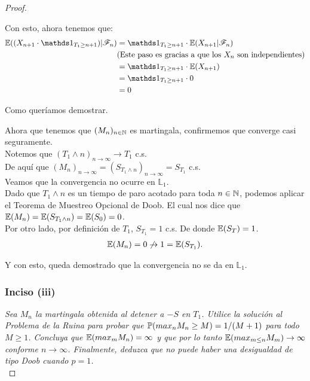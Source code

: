\begin{proof}
\begin{itemize}
				Con esto, ahora tenemos que:
				\begin{align}
					\E((X_{n+1} \cdot \indic_{T_1 \geq n+1}) | \F_{n}) &= \indic_{T_1 \geq n+1} \cdot \E(X_{n+1} | \F_{n}) \\
					&\mbox{(Este paso es gracias a que los $X_n$ son independientes)} \\
					&=\indic_{T_1 \geq n+1} \cdot \E(X_{n+1} ) \\
					&=\indic_{T_1 \geq n+1} \cdot 0 \\
					&= 0
				\end{align}	
				
				Como queríamos demostrar.
		\end{itemize}
		
		Ahora que tenemos que $(M_n)_{n \in \mathbb{N}}$ es martingala, confirmemos que converge casi seguramente.\\
		
		Notemos que $(T_1 \wedge n)_{n \rightarrow \infty} \rightarrow T_1$ c.s.\\
		
		De aquí que $(M_n)_{n \rightarrow \infty} = (S_{T_1 \wedge n})_{n \rightarrow \infty} = S_{T_1}$ c.s. \\				
		
		Veamos que la convergencia no ocurre en $\mathbb{L}_1$. \\
					
		Dado que $T_1 \wedge n$ es un tiempo de paro acotado para toda $n \in \mathbb{N}$,
		podemos aplicar el Teorema de Muestreo Opcional de 	Doob. 
		El cual nos dice que $\mathbb{E}(M_n) = \mathbb{E}(S_{T_1 \wedge n}) = \mathbb{E}(S_0) = 0$.\\
		
		Por otro lado, por definición de $T_1$, $S_{T_1} = 1$ c.s.	De donde $\mathbb{E}(S_T) = 1$.\\
		
		\begin{align}
			\mathbb{E}(M_n) = 0 \not\rightarrow 1 = \mathbb{E}(S_{T_1}).
		\end{align}			
		
		Y con esto, queda demostrado que la convergencia no se da en $\mathbb{L}_1$.\\
		
	\subsubsection{Inciso (iii)}		
	\emph{
		Sea $M_n$ la martingala obtenida al detener a $-S$ en $T_1$. Utilice la solución al
		Problema de la Ruina para probar que $\mathbb{P}(max_n M_n \geq M) = 1/(M+1)$ para todo $M \geq 1$. Concluya que
		$\mathbb{E}(max_m M_n) = \infty$ y que por lo tanto $\mathbb{E}(max_{m\leq n} M_m) \rightarrow \infty$ conforme 
		$n \rightarrow \infty$. Finalmente, deduzca que no puede haber una desigualdad de tipo Doob cuando $p=1$.\\
	}	


\end{proof}

